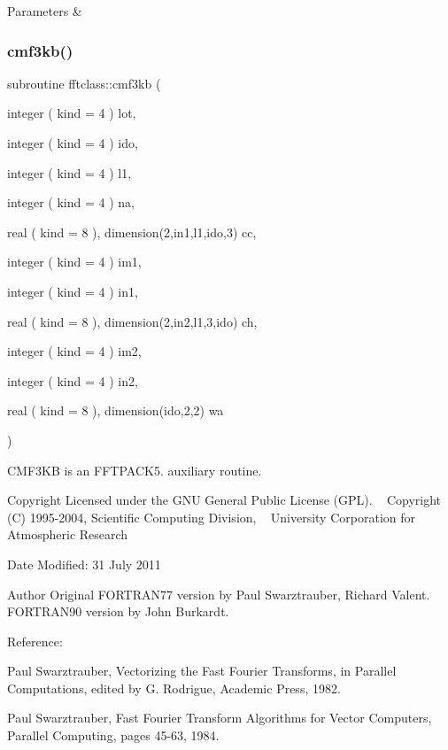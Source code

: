 \begin{DoxyParams}{Parameters}
{\em } & \\
\hline
\end{DoxyParams}
\mbox{\label{namespacefftclass_afc9e57527719d38dc3716ee9bf6b090d}} 
\subsubsection{\texorpdfstring{cmf3kb()}{cmf3kb()}}
{\footnotesize\ttfamily subroutine fftclass\+::cmf3kb (\begin{DoxyParamCaption}\item[{integer ( kind = 4 )}]{lot,  }\item[{integer ( kind = 4 )}]{ido,  }\item[{integer ( kind = 4 )}]{l1,  }\item[{integer ( kind = 4 )}]{na,  }\item[{real ( kind = 8 ), dimension(2,in1,l1,ido,3)}]{cc,  }\item[{integer ( kind = 4 )}]{im1,  }\item[{integer ( kind = 4 )}]{in1,  }\item[{real ( kind = 8 ), dimension(2,in2,l1,3,ido)}]{ch,  }\item[{integer ( kind = 4 )}]{im2,  }\item[{integer ( kind = 4 )}]{in2,  }\item[{real ( kind = 8 ), dimension(ido,2,2)}]{wa }\end{DoxyParamCaption})}



C\+M\+F3\+KB is an F\+F\+T\+P\+A\+C\+K5. auxiliary routine. 

\begin{DoxyCopyright}{Copyright}
Licensed under the G\+NU General Public License (G\+PL). ~\newline
 Copyright (C) 1995-\/2004, Scientific Computing Division, ~\newline
 University Corporation for Atmospheric Research 
\end{DoxyCopyright}
\begin{DoxyDate}{Date}
Modified\+: 31 July 2011 
\end{DoxyDate}
\begin{DoxyAuthor}{Author}
Original F\+O\+R\+T\+R\+A\+N77 version by Paul Swarztrauber, Richard Valent. ~\newline
 F\+O\+R\+T\+R\+A\+N90 version by John Burkardt.
\end{DoxyAuthor}
\begin{DoxyVerb}  Reference:

    Paul Swarztrauber,
    Vectorizing the Fast Fourier Transforms,
    in Parallel Computations,
    edited by G. Rodrigue,
    Academic Press, 1982.

    Paul Swarztrauber,
    Fast Fourier Transform Algorithms for Vector Computers,
    Parallel Computing, pages 45-63, 1984.\end{DoxyVerb}
 
